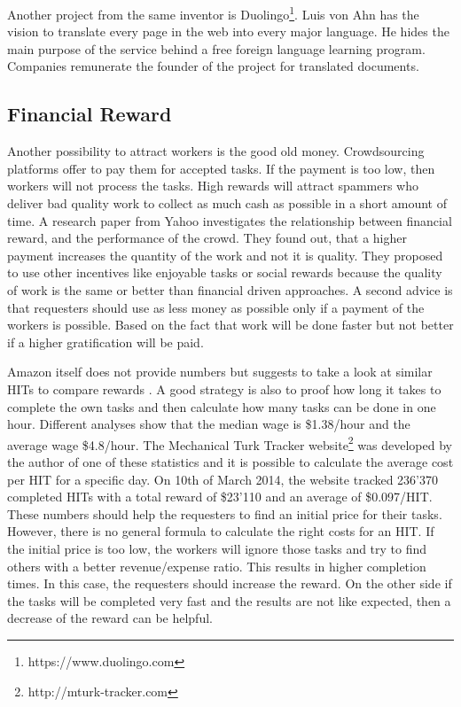 Another project from the same inventor is Duolingo\footnote{https://www.duolingo.com}. Luis von Ahn has the vision to translate every page in the web into every major language. He hides the main purpose of the service behind a free foreign language learning program. Companies remunerate the founder of the project for translated documents.

\subsection{Financial Reward}
Another possibility to attract workers is the good old money. Crowdsourcing platforms offer to pay them for accepted tasks. If the payment is too low, then workers will not process the tasks. High rewards will attract spammers who deliver bad quality work to collect as much cash as possible in a short amount of time. A research paper from Yahoo \cite{mason} investigates the relationship between financial reward, and the performance of the crowd. They found out, that a higher payment increases the quantity of the work and not it is quality. They proposed to use other incentives like enjoyable tasks or social rewards because the quality of work is the same or better than financial driven approaches. A second advice is that requesters should use as less money as possible only if a payment of the workers is possible. Based on the fact that work will be done faster but not better if a higher gratification will be paid.

Amazon itself does not provide numbers but suggests to take a look at similar HITs to compare rewards \cite{mturk_bestpractices}. A good strategy is also to proof how long it takes to complete the own tasks and then calculate how many tasks can be done in one hour. Different analyses \cite{chilton,ipeirotis} show that the median wage is \$1.38/hour and the average wage \$4.8/hour. The Mechanical Turk Tracker website\footnote{http://mturk-tracker.com} was developed by the author of one of these statistics \cite{ipeirotis} and it is possible to calculate the average cost per HIT for a specific day. On 10th of March 2014, the website tracked 236'370 completed HITs with a total reward of \$23'110 and an average of \$0.097/HIT. These numbers should help the requesters to find an initial price for their tasks. However, there is no general formula to calculate the right costs for an HIT. If the initial price is too low, the workers will ignore those tasks and try to find others with a better revenue/expense ratio. This results in higher completion times. In this case, the requesters should increase the reward. On the other side if the tasks will be completed very fast and the results are not like expected, then a decrease of the reward can be helpful.

